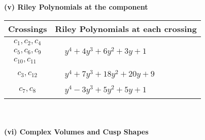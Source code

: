 \documentclass[1p]{elsarticle_modified}
\theoremstyle{definition}
\begin{document}
\newpage\renewcommand{\arraystretch}{1}
\flushleft \textbf{(v) Riley Polynomials at the component}\newline \\
\begin{tabular}{m{50pt}|m{274pt}}
Crossings & \hspace{64pt}Riley Polynomials at each crossing \\
\hline $$\begin{aligned}c_{1},c_{2},c_{4}\\c_{5},c_{6},c_{9}\\c_{10},c_{11}\end{aligned}$$&$\begin{aligned}
&y^4+4 y^3+6 y^2+3 y+1
\end{aligned}$\\
\hline $$\begin{aligned}c_{3},c_{12}\end{aligned}$$&$\begin{aligned}
&y^4+7 y^3+18 y^2+20 y+9
\end{aligned}$\\
\hline $$\begin{aligned}c_{7},c_{8}\end{aligned}$$&$\begin{aligned}
&y^4-3 y^3+5 y^2+5 y+1
\end{aligned}$\\
\hline
\end{tabular}\\~\\
\newpage\flushleft \textbf{(vi) Complex Volumes and Cusp Shapes}
\end{document}

